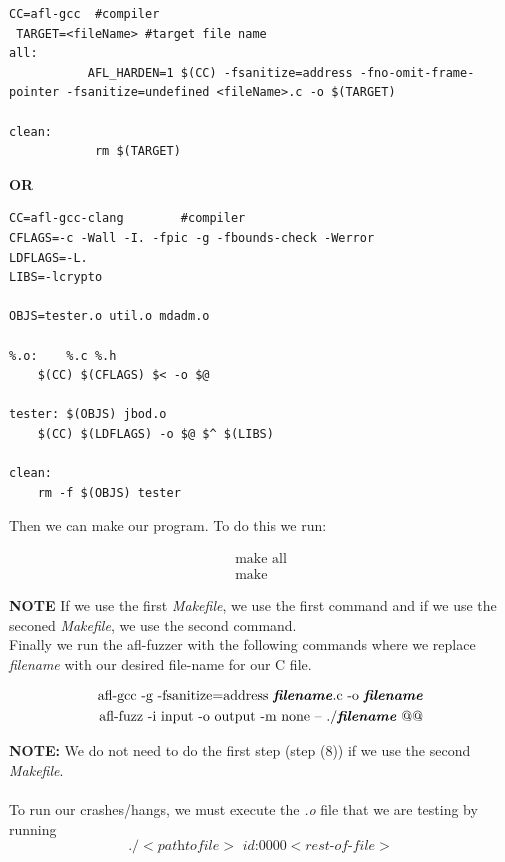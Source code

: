 \documentclass[11pt]{article}
\begin{document}
\begin{lstlisting}[style=CStyle]
 CC=afl-gcc  #compiler
 TARGET=<fileName> #target file name
all:
           AFL_HARDEN=1 $(CC) -fsanitize=address -fno-omit-frame-pointer -fsanitize=undefined <fileName>.c -o $(TARGET)

clean:
            rm $(TARGET)
\end{lstlisting}

\textbf{OR}

\begin{lstlisting}[style=CStyle]
CC=afl-gcc-clang        #compiler
CFLAGS=-c -Wall -I. -fpic -g -fbounds-check -Werror
LDFLAGS=-L.
LIBS=-lcrypto

OBJS=tester.o util.o mdadm.o

%.o:	%.c %.h
	$(CC) $(CFLAGS) $< -o $@

tester:	$(OBJS) jbod.o
	$(CC) $(LDFLAGS) -o $@ $^ $(LIBS)

clean:
	rm -f $(OBJS) tester
\end{lstlisting}

Then we can make our program. To do this we run:

\begin{eqnarray}
    \text{make all} \\
    \text{make}
\end{eqnarray}


\textbf{NOTE} If we use the first \textit{Makefile}, we use the first command and if we use the seconed \textit{Makefile}, we use the second command. \\


Finally we run the afl-fuzzer with the following commands where we replace \textit{filename} with our desired file-name for our C file.

\begin{eqnarray}
\text{afl-gcc -g -fsanitize=address \textbf{\textit{filename}}.c -o \textbf{\textit{filename}}} \\
\text{afl-fuzz -i input -o output -m none -- ./\textbf{\textit{filename}} @@}
\end{eqnarray}

\textbf{NOTE:} We do not need to do the first step (step (8)) if we use the second \textit{Makefile}. 
\\
\\
To run our crashes/hangs, we must execute the \textit{.o} file that we are testing by running 
\begin{equation}
    \textit{./$<$pathtofile$>$  id:0000$<$rest-of-file$>$}
\end{equation}
\end{document}
